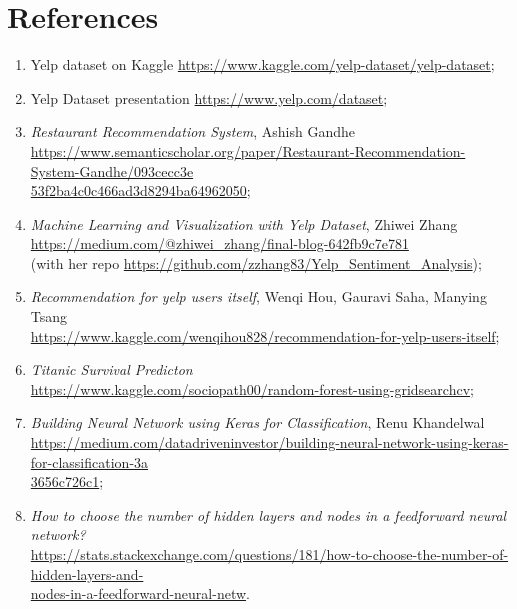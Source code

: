 
\section{References}

\begin{enumerate}
    \item Yelp dataset on Kaggle \href{https://www.kaggle.com/yelp-dataset/yelp-dataset}{https://www.kaggle.com/yelp-dataset/yelp-dataset};\label{yelp-kaggle}
    \item Yelp Dataset presentation \href{https://www.yelp.com/dataset}{https://www.yelp.com/dataset};
    \item \textit{Restaurant Recommendation System}, Ashish Gandhe \\ \href{https://www.semanticscholar.org/paper/Restaurant-Recommendation-System-Gandhe/093cecc3e53f2ba4c0c466ad3d8294ba64962050}{https://www.semanticscholar.org/paper/Restaurant-Recommendation-System-Gandhe/093cecc3e\\53f2ba4c0c466ad3d8294ba64962050}; \label{Gandhe}
    \item \textit{Machine Learning and Visualization with Yelp Dataset}, Zhiwei Zhang \\ \href{https://medium.com/@zhiwei_zhang/final-blog-642fb9c7e781}{https://medium.com/@zhiwei\_zhang/final-blog-642fb9c7e781} \\
    (with her repo \href{https://github.com/zzhang83/Yelp_Sentiment_Analysis}{https://github.com/zzhang83/Yelp\_Sentiment\_Analysis}); \label{Zhang}
    \item \textit{Recommendation for yelp users itself}, Wenqi Hou, Gauravi Saha, Manying Tsang \\ \href{https://www.kaggle.com/wenqihou828/recommendation-for-yelp-users-itself}{https://www.kaggle.com/wenqihou828/recommendation-for-yelp-users-itself}; \label{Hou}
    \item \textit{Titanic Survival Predicton}\\ \href{https://www.kaggle.com/sociopath00/random-forest-using-gridsearchcv}{https://www.kaggle.com/sociopath00/random-forest-using-gridsearchcv}; \label{titanic}
    \item \textit{Building Neural Network using Keras for Classification}, Renu Khandelwal \\ \href{https://medium.com/datadriveninvestor/building-neural-network-using-keras-for-classification-3a3656c726c1}{https://medium.com/datadriveninvestor/building-neural-network-using-keras-for-classification-3a\\3656c726c1}; \label{Khandelwal}
    \item \textit{How to choose the number of hidden layers and nodes in a feedforward neural network?} \\ \href{https://stats.stackexchange.com/questions/181/how-to-choose-the-number-of-hidden-layers-and-nodes-in-a-feedforward-neural-netw}{https://stats.stackexchange.com/questions/181/how-to-choose-the-number-of-hidden-layers-and-\\nodes-in-a-feedforward-neural-netw}. \label{stack}
\end{enumerate}



